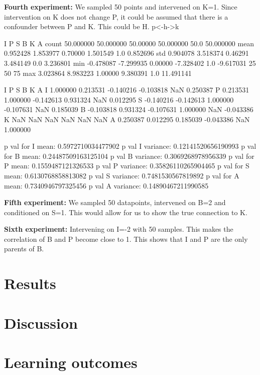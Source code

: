\documentclass[12pt,fleqn,]{article}
\begin{document}
\begin{multicols}{2}
\textbf{Fourth experiment:} We sampled 50 points and intervened on K=1. Since intervention on K does not change P, it could be assumed that there is a confounder between P and K. This could be H.
p<-h->k


           I          P         S          B     K          A
count  50.000000  50.000000  50.00000  50.000000  50.0  50.000000
mean    0.952428   1.853977   0.70000   1.501549   1.0   0.852696
std     0.904078   3.518374   0.46291   3.484149   0.0   3.236801
min    -0.478087  -7.299935   0.00000  -7.328402   1.0  -9.617031
25%
50%
75%
max     3.023864   8.983223   1.00000   9.380391   1.0  11.491141

      I         P         S         B   K         A
I  1.000000  0.213531 -0.140216 -0.103818 NaN  0.250387
P  0.213531  1.000000 -0.142613  0.931324 NaN  0.012295
S -0.140216 -0.142613  1.000000 -0.107631 NaN  0.185039
B -0.103818  0.931324 -0.107631  1.000000 NaN -0.043386
K       NaN       NaN       NaN       NaN NaN       NaN
A  0.250387  0.012295  0.185039 -0.043386 NaN  1.000000

p val for I mean: 0.5972710034477902
p val I variance: 0.12141520656190993
p val for B mean: 0.24487509163125104
p val B variance: 0.3069268978956339
p val for P mean: 0.1559487121326533
p val P variance: 0.35826110265904465
p val for S mean: 0.6130768858813082
p val S variance: 0.7481530567819892
p val for A mean: 0.7340946797325456
p val A variance: 0.14890467211990585

\textbf{Fifth experiment:} We sampled 50 datapoints, intervened on B=2 and conditioned on S=1. This would allow for us to show the true connection to K.

\textbf{Sixth experiment: } Intervening on I=-2 with 50 samples. This makes the correlation of B and P become close to 1. This shows that I and P are the only parents of B.

\end{multicols}		

\section{Results}



\begin{multicols}{2}
	
	\section{Discussion}
	

	
	\section{Learning outcomes} 
	
\end{multicols}

\newpage
\begin{thebibliography}{9}
	

	
	
	

\end{thebibliography}
\end{document}
